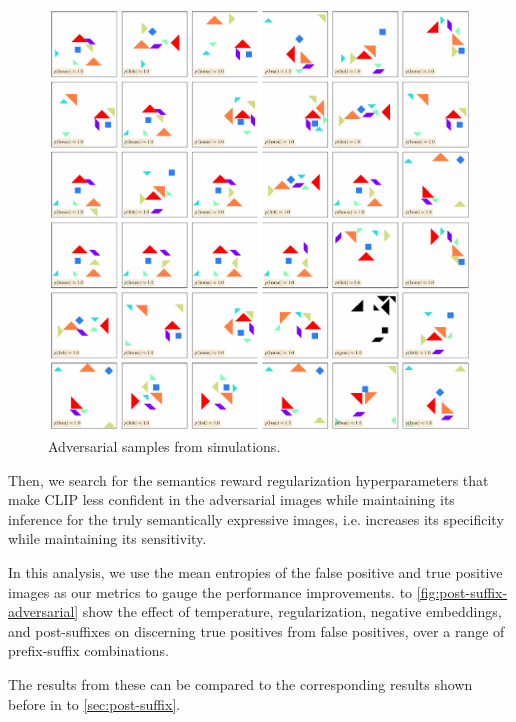 \begin{figure}[h]
    \centering
    \includegraphics[width=\textwidth]{images/adversarial_samples.pdf}
    \caption{Adversarial samples from simulations.}
    \label{fig:semantic-bias-random}
\end{figure}

Then, we search for the semantics reward regularization hyperparameters that make CLIP less confident in the adversarial images while maintaining its inference for the truly semantically expressive images, i.e. increases its specificity while maintaining its sensitivity.

In this analysis, we use the mean entropies of the false positive and true positive images as our metrics to gauge the performance improvements.
 to \ref{fig:post-suffix-adversarial} show the effect of temperature, regularization, negative embeddings, and post-suffixes on discerning true positives from false positives, over a range of prefix-suffix combinations.

The results from these can be compared to the corresponding results shown before in  to \ref{sec:post-suffix}.

